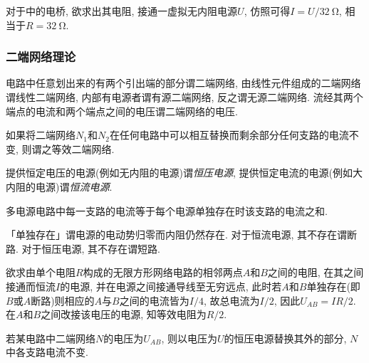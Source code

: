 \documentclass[../Electromagnetism.tex]{subfiles}
\begin{document}
\begin{ex}
	对于中的电桥, 欲求出其电阻, 接通一虚拟无内阻电源$U$, 仿照可得$I = U/\SI{32}{\ohm}$, 相当于$R=\SI{32}{\ohm}$.
\end{ex}


\subsubsection{二端网络理论} %
\label{ssub:二端网络理论}

\begin{definition}[二端网络]
	电路中任意划出来的有两个引出端的部分谓二端网络, 由线性元件组成的二端网络谓线性二端网络, 内部有电源者谓有源二端网络, 反之谓无源二端网络. 流经其两个端点的电流和两个端点之间的电压谓二端网络的电压.
\end{definition}
\begin{definition}[等效二端网络]
	如果将二端网络$N_1$和$N_2$在任何电路中可以相互替换而剩余部分任何支路的电流不变, 则谓之等效二端网络.
\end{definition}
提供恒定电压的电源(例如无内阻的电源)谓\emph{恒压电源}, 提供恒定电流的电源(例如大内阻的电源)谓\emph{恒流电源}.
\begin{finale}
	\begin{theorem}[电路的叠加定理]
		多电源电路中每一支路的电流等于每个电源单独存在时该支路的电流之和.
	\end{theorem}
\end{finale}
\begin{remark}
	\label{rm:电源的单独存在}
	「单独存在」谓电源的电动势归零而内阻仍然存在. 对于恒流电源, 其不存在谓断路. 对于恒压电源, 其不存在谓短路.
\end{remark}
\begin{ex}
	欲求由单个电阻$R$构成的无限方形网络电路的相邻两点$A$和$B$之间的电阻, 在其之间接通而恒流$I$的电源, 并在电源之间接通导线至无穷远点, 此时若$A$和$B$单独存在(即$B$或$A$断路)则相应的$A$与$B$之间的电流皆为$I/4$, 故总电流为$I/2$, 因此$U_{AB} = IR/2$. 在$A$和$B$之间改接该电压的电源, 知等效电阻为$R/2$.
\end{ex}
\begin{finale}
	\begin{theorem}[电路的替代定理]
		若某电路中二端网络$N$的电压为$U_{AB}$, 则以电压为$U$的恒压电源替换其外的部分, $N$中各支路电流不变.
	\end{theorem}
\end{finale}
\end{document}
